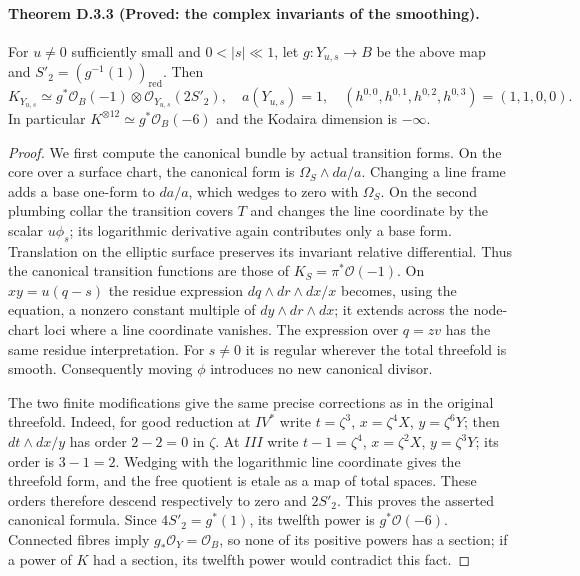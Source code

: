\paragraph{Theorem D.3.3 (Proved: the complex invariants of the smoothing).}
For $u\ne0$ sufficiently small and $0<|s|\ll1$, let $g:Y_{u,s}\to B$
be the above map and $S'_2=(g^{-1}(1))_{\mathrm{red}}$. Then
\[
 K_{Y_{u,s}}\simeq g^*\mathcal O_B(-1)\otimes\mathcal O_{Y_{u,s}}(2S'_2),
 \quad a(Y_{u,s})=1,
 \quad (h^{0,0},h^{0,1},h^{0,2},h^{0,3})=(1,1,0,0).
\]
In particular $K^{\otimes12}\simeq g^*\mathcal O_B(-6)$ and the
Kodaira dimension is $-\infty$.
\begin{proof}
We first compute the canonical bundle by actual transition forms.
On the core over a surface chart, the canonical form is
$\Omega_S\wedge da/a$. Changing a line frame adds a base one-form
to $da/a$, which wedges to zero with $\Omega_S$. On the second
plumbing collar the transition covers $T$ and changes the line
coordinate by the scalar $u\phi_s$; its logarithmic derivative
again contributes only a base form. Translation on the elliptic
surface preserves its invariant relative differential. Thus the
canonical transition functions are those of $K_S=\pi^*\mathcal O(-1)$.
On $xy=u(q-s)$ the residue expression
$dq\wedge dr\wedge dx/x$ becomes, using the equation,
a nonzero constant multiple of $dy\wedge dr\wedge dx$; it extends
across the node-chart loci where a line coordinate vanishes.
The expression over $q=zv$ has the same residue interpretation.
For $s\ne0$ it is regular wherever the total threefold is smooth.
Consequently moving $\phi$ introduces no new canonical divisor.

The two finite modifications give the same precise corrections as
in the original threefold. Indeed, for good reduction at $IV^*$
write $t=\zeta^3$, $x=\zeta^4X$, $y=\zeta^6Y$; then
$dt\wedge dx/y$ has order $2-2=0$ in $\zeta$. At $III$ write
$t-1=\zeta^4$, $x=\zeta^2X$, $y=\zeta^3Y$; its order is
$3-1=2$. Wedging with the logarithmic line coordinate gives the
threefold form, and the free quotient is etale as a map of total
spaces. These orders therefore descend respectively to zero and
$2S'_2$. This proves the asserted canonical formula. Since
$4S'_2=g^*(1)$, its twelfth power is $g^*\mathcal O(-6)$.
Connected fibres imply $g_*\mathcal O_Y=\mathcal O_B$, so none of
its positive powers has a section; if a power of $K$ had a section,
its twelfth power would contradict this fact.


\end{proof}
